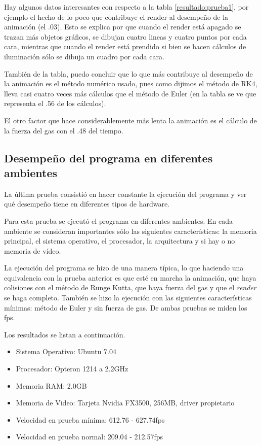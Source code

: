 Hay algunos datos interesantes con respecto a la tabla \ref{resultado:prueba1}, por ejemplo el hecho de lo poco que contribuye el render al desempeño de la animación (el .03).
Esto se explica por que cuando el render está apagado se trazan más objetos gráficos, se dibujan cuatro lineas y cuatro puntos por cada cara, mientras que cuando el render está prendido si bien se hacen cálculos de iluminación sólo se dibuja un cuadro por cada cara.

También de la tabla, puedo concluir  que lo que más contribuye al desempeño de la animación es el método numérico usado, pues como dijimos el
método de RK4, lleva casi cuatro veces más cálculos que el método de Euler (en la tabla se ve que representa el .56 de los cálculos).

El otro factor que hace considerablemente más lenta la animación es el cálculo de la fuerza del gas con el .48 del tiempo.

\subsection{Desempeño del programa en diferentes ambientes}

La última prueba consistió en hacer constante la ejecución del programa y ver qué desempeño tiene en diferentes tipos de hardware.

Para esta  prueba se ejecutó el programa en diferentes ambientes.
En cada ambiente se consideran importantes sólo las siguientes características: la memoria principal, el sistema operativo, el procesador, la arquitectura y si hay o no memoria de vídeo.

La ejecución del programa se hizo de una manera típica, lo que haciendo una equivalencia con la prueba anterior es que esté en marcha la animación, que haya colisiones con el método de Runge Kutta, que haya fuerza del gas y que el \emph{\foreignlanguage{english}{render}} se haga completo.
También se hizo la ejecución con las siguientes características mínimas: método de Euler y sin fuerza de gas.
De ambas pruebas se miden los fps.

Los resultados se listan a continuación.
\begin{itemize}
 \item Sistema Operativo: Ubuntu 7.04
 \item Procesador: Opteron 1214 a 2.2GHz
 \item Memoria RAM: 2.0GB
 \item Memoria de Video: Tarjeta Nvidia FX3500, 256MB, driver propietario
 \item Velocidad en prueba mínima: 612.76 - 627.74fps
 \item Velocidad en prueba normal: 209.04 - 212.57fps
\end{itemize}


